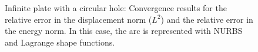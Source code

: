     \begin{figure}
        \centering
        \caption{
            Infinite plate with a circular hole: Convergence results for the relative error in the displacement norm ($L^2$) and
                the relative error in the energy norm. In this case, the arc is represented with NURBS and Lagrange shape functions.
        }
        \label{iso_fig:circular_hole_shape_function_convergence}
    \end{figure}

\pagebreak